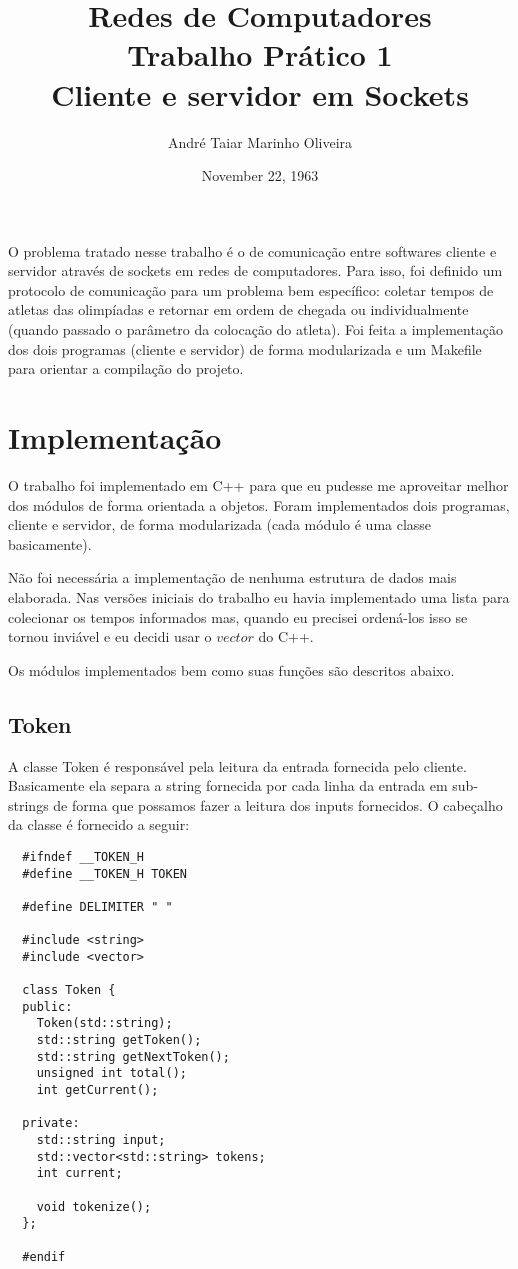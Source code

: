 \documentclass[12pt]{article}
\title{Redes de Computadores \\ Trabalho Prático 1 \\
\huge{Cliente e servidor em Sockets}}
\date{November 22, 1963}
\author{André Taiar Marinho Oliveira}
\begin{document}
\maketitle

\begin{resumo}
O problema tratado nesse trabalho é o de comunicação entre softwares cliente e
servidor através de sockets em redes de computadores. Para isso, foi definido um
protocolo de comunicação para um problema bem específico: coletar tempos de
atletas das olimpíadas e retornar em ordem de chegada ou individualmente (quando
passado o parâmetro da colocação do atleta). Foi feita a implementação dos dois
programas (cliente e servidor) de forma modularizada e um Makefile para orientar
a compilação do projeto.
\end{resumo}

\section{Implementação}

O trabalho foi implementado em C++ para que eu pudesse me aproveitar melhor dos
módulos de forma orientada a objetos. Foram implementados dois programas,
cliente e servidor, de forma modularizada (cada módulo é uma classe
basicamente).

Não foi necessária a implementação de nenhuma estrutura de dados mais elaborada.
Nas versões iniciais do trabalho eu havia implementado uma lista para colecionar
os tempos informados mas, quando eu precisei ordená-los isso se tornou inviável
e eu decidi usar o $vector$ do C++.

Os módulos implementados bem como suas funções são descritos abaixo.

\subsection{Token}

A classe Token é responsável pela leitura da entrada fornecida pelo cliente.
Basicamente ela separa a string fornecida por cada linha da entrada em
sub-strings de forma que possamos fazer a leitura dos inputs fornecidos. O
cabeçalho da classe é fornecido a seguir:

\begin{verbatim}
  #ifndef __TOKEN_H
  #define __TOKEN_H TOKEN

  #define DELIMITER " "

  #include <string>
  #include <vector>

  class Token {
  public:
    Token(std::string);
    std::string getToken();
    std::string getNextToken();
    unsigned int total();
    int getCurrent();

  private:
    std::string input;
    std::vector<std::string> tokens;
    int current;

    void tokenize();
  };

  #endif
\end{verbatim}
\end{document}
